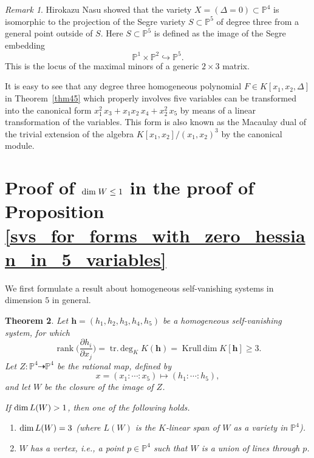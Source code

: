\documentclass[12pt]{article}
\newtheorem{theorem}{Theorem}[section]
\theoremstyle{definition}
\theoremstyle{remark}
\newtheorem{remark}[theorem]{Remark}
\def\dim{{\rm dim}}
\newcommand {\PP}{\mathbb{P}}
\def\rk{\operatorname{rank}}
\def\krdim{\operatorname{Krull\,dim}}
\def\trdeg{\operatorname{tr.\,deg}}
\begin{document}
\begin{remark} \label{rem_by_H-Nasu} %
Hirokazu Nasu showed  that the variety $X=(\Delta =0) \subset \PP ^4$ is isomorphic to 
the projection of the Segre variety $S \subset  \PP ^5$ of degree three from a general 
point outside of $S$. Here $S \subset \PP^5$ is defined as the image of the Segre embedding 
\[   \PP ^1 \times \PP ^2 \hookrightarrow \PP ^5. \]
This is the locus of the maximal minors of a generic 
$2 \times  3$ matrix. 

It is easy to see that  any degree three homogeneous polynomial $F \in K[x_1,x_2,\Delta]$ in 
Theorem~\ref{thm45} %
which properly involves five variables
can be transformed into the canonical form  $x_1^2\,x_3+ x_1x_2\,x_4+ x_2^2\,x_5$ by means of a 
linear transformation of the variables.  
This form  is also known as the Macaulay dual of the 
trivial extension of the algebra $K[x_1, x_2]/ (x_1,x_2)^3$ by the canonical module.  
\end{remark} 


\section{Proof of {$\dim \; W \leq 1$ in the proof of 
Proposition \ref{svs_for_forms_with_zero_hessian_in_5_variables}}}

We first formulate a result about homogeneous self-vanishing systems in dimension $5$
in general.

\begin{theorem} \label{h}
Let $\bm{h} = (h_1,h_2,h_3,h_4,h_5)$ be a homogeneous self-vanishing system,
for which 
$$
\rk \Big(\frac{\partial h_i}{\partial x_j}\Big) = \trdeg_K K(\bm{h}) = \krdim K[\bm{h}] \ge 3.
$$
Let $Z: \PP^4 \dashrightarrow \PP^4$ be the rational map, defined by
$$
x = (x_1 : \cdots : x_5) \mapsto (h_1 : \cdots : h_5),
$$
and let $W$ be the closure of the image of $Z$.

If $\dim\, L(W) > 1$, then one of the following holds.
\begin{enumerate}

\item[\upshape(1)] $\dim\, L(W) = 3$ (where $L(W)$ is the $K$-linear span of $W$ as a variety in $\PP^4$).

\item[\upshape(2)] $W$ has a vertex, i.e., a point $p \in \PP^4$ such that $W$ is a union
of lines through $p$.

\end{enumerate}
\end{theorem}
\end{document}
